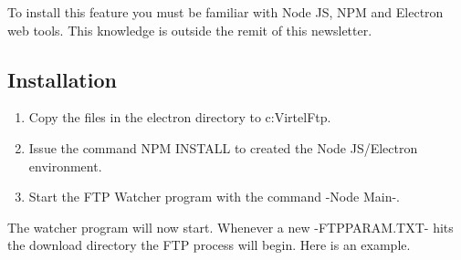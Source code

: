 \documentclass[letterpaper,10pt,english]{sphinxmanual}
\begin{document}
To install this feature you must be familiar with Node JS, NPM and Electron web tools. This knowledge is outside the remit of this newsletter.


\subsection{Installation}
\label{\detokenize{TN201905:installation}}\begin{enumerate}
\def\theenumi{\arabic{enumi}}
\def\labelenumi{\theenumi .}
\makeatletter\def\p@enumii{\p@enumi \theenumi .}\makeatother
\item {} 
Copy the files in the electron directory to c:VirtelFtp.

\item {} 
Issue the command NPM INSTALL to created the Node JS/Electron environment.

\item {} 
Start the FTP Watcher program with the command -Node Main-.

\end{enumerate}

The watcher program will now start. Whenever a new -FTPPARAM.TXT- hits the download directory the FTP process will begin. Here is an example.

\begin{sphinxVerbatim}[commandchars=\\\{\}]
\PYGZbs{}\PYGZbs{} 
    \PYGZbs{}\PYGZbs{}\PYGZbs{}\PYGZbs{}

  
      \PYGZbs{}\PYGZbs{}\PYGZbs{}\PYGZbs{}
\PYGZbs{}\PYGZbs{} 
    
\end{sphinxVerbatim}



\renewcommand{\indexname}{Index}
\printindex
\end{document}
